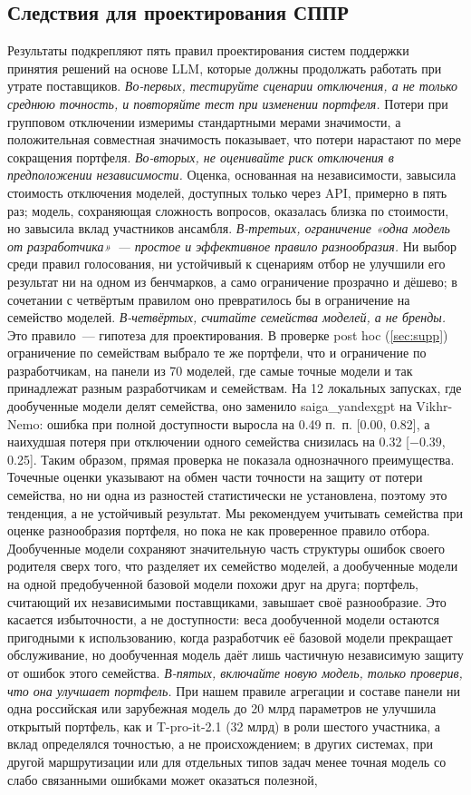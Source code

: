 \documentclass[preprint,12pt,authoryear]{elsarticle}
\begin{document}
\subsection{Следствия для проектирования СППР}
Результаты подкрепляют пять правил проектирования систем поддержки принятия решений на основе LLM, которые должны продолжать работать при утрате поставщиков. \emph{Во-первых, тестируйте сценарии отключения, а не только среднюю точность, и повторяйте тест при изменении портфеля.} Потери при групповом отключении измеримы стандартными мерами значимости, а положительная совместная значимость показывает, что потери нарастают по мере сокращения портфеля. \emph{Во-вторых, не оценивайте риск отключения в предположении независимости.} Оценка, основанная на независимости, завысила стоимость отключения моделей, доступных только через API, примерно в пять раз; модель, сохраняющая сложность вопросов, оказалась близка по стоимости, но завысила вклад участников ансамбля. \emph{В-третьих, ограничение «одна модель от разработчика»~--- простое и эффективное правило разнообразия.} Ни выбор среди правил голосования, ни устойчивый к сценариям отбор не улучшили его результат ни на одном из бенчмарков, а само ограничение прозрачно и дёшево; в сочетании с четвёртым правилом оно превратилось бы в ограничение на семейство моделей. \emph{В-четвёртых, считайте семейства моделей, а не бренды.} Это правило~--- гипотеза для проектирования. В проверке post hoc (\ref{sec:supp}) ограничение по семействам выбрало те же портфели, что и ограничение по разработчикам, на панели из 70 моделей, где самые точные модели и так принадлежат разным разработчикам и семействам. На 12 локальных запусках, где дообученные модели делят семейства, оно заменило saiga\_yandexgpt на Vikhr-Nemo: ошибка при полной доступности выросла на 0.49 п.~п. [0.00, 0.82], а наихудшая потеря при отключении одного семейства снизилась на 0.32 [$-0.39$, 0.25]. Таким образом, прямая проверка не показала однозначного преимущества. Точечные оценки указывают на обмен части точности на защиту от потери семейства, но ни одна из разностей статистически не установлена, поэтому это тенденция, а не устойчивый результат. Мы рекомендуем учитывать семейства при оценке разнообразия портфеля, но пока не как проверенное правило отбора. Дообученные модели сохраняют значительную часть структуры ошибок своего родителя сверх того, что разделяет их семейство моделей, а дообученные модели на одной предобученной базовой модели похожи друг на друга; портфель, считающий их независимыми поставщиками, завышает своё разнообразие. Это касается избыточности, а не доступности: веса дообученной модели остаются пригодными к использованию, когда разработчик её базовой модели прекращает обслуживание, но дообученная модель даёт лишь частичную независимую защиту от ошибок этого семейства. \emph{В-пятых, включайте новую модель, только проверив, что она улучшает портфель.} При нашем правиле агрегации и составе панели ни одна российская или зарубежная модель до 20 млрд параметров не улучшила открытый портфель, как и T-pro-it-2.1 (32 млрд) в роли шестого участника, а вклад определялся точностью, а не происхождением; в других системах, при другой маршрутизации или для отдельных типов задач менее точная модель со слабо связанными ошибками может оказаться полезной, 
\end{document}

